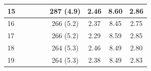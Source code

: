\begin{table}[]
\begin{tabular}{|l|c|c|c|c|c|c|c|c|}
15                                    &                   &                     &                   &                       & 287 (4.9)         & 2.46                & 8.60              & 2.86                  \\ \hline
16                                    &                   &                     &                   &                       & 266 (5.2)         & 2.37                & 8.45              & 2.75                  \\ \hline
17                                    &                   &                     &                   &                       & 266 (5.2)         & 2.29                & 8.59              & 2.85                  \\ \hline
18                                    &                   &                     &                   &                       & 264 (5.3)         & 2.46                & 8.49              & 2.80                  \\ \hline
19                                    &                   &                     &                   &                       & 264 (5.3)         & 2.38                & 8.49              & 2.83                  \\ \hline
\end{tabular}
\end{table}